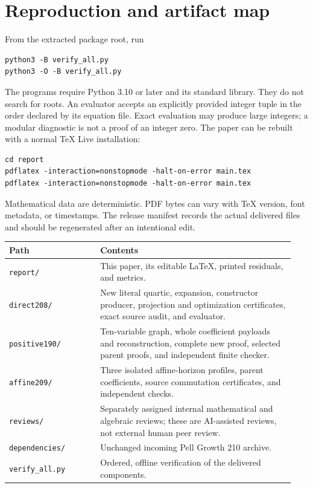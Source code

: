 \documentclass[11pt,letterpaper]{article}
\theoremstyle{remark}\newtheorem{remark}[theorem]{Remark}
\newcommand{\code}[1]{\nolinkurl{#1}}
\begin{document}
\section{Reproduction and artifact map}

From the extracted package root, run
\begin{lstlisting}
python3 -B verify_all.py
python3 -O -B verify_all.py
\end{lstlisting}
The programs require Python 3.10 or later and its standard library. They
do not search for roots. An evaluator accepts an explicitly provided
integer tuple in the order declared by its equation file. Exact evaluation
may produce large integers; a modular diagnostic is not a proof of an
integer zero. The paper can be rebuilt with a normal TeX Live installation:
\begin{lstlisting}
cd report
pdflatex -interaction=nonstopmode -halt-on-error main.tex
pdflatex -interaction=nonstopmode -halt-on-error main.tex
\end{lstlisting}
Mathematical data are deterministic. PDF bytes can vary with TeX version,
font metadata, or timestamps. The release manifest records the actual
delivered files and should be regenerated after an intentional edit.

\begin{center}
\small
\begin{tabular}{@{}p{0.30\linewidth}p{0.64\linewidth}@{}}
\toprule
Path&Contents\\\midrule
\code{report/}&This paper, its editable LaTeX, printed residuals, and metrics.\\
\code{direct208/}&New literal quartic, expansion, constructor producer, projection
and optimization certificates, exact source audit, and evaluator.\\
\code{positive190/}&Ten-variable graph, whole coefficient payloads and reconstruction,
complete new proof, selected parent proofs, and independent finite checker.\\
\code{affine209/}&Three isolated affine-horizon profiles, parent coefficients,
source commutation certificates, and independent checks.\\
\code{reviews/}&Separately assigned internal mathematical and algebraic reviews;
these are AI-assisted reviews, not external human peer review.\\
\code{dependencies/}&Unchanged incoming Pell Growth 210 archive.\\
\code{verify_all.py}&Ordered, offline verification of the delivered components.\\
\bottomrule
\end{tabular}
\end{center}
\end{document}

